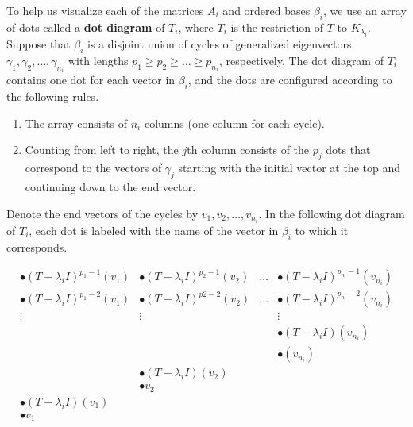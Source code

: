 \begin{definition}
	To help us visualize each of the matrices $A_i$ and ordered bases $\beta_i$, we use an array of dots called a \textbf{dot diagram} of $T_i$, where $T_i$ is the restriction of $T$ to $K_{\lambda_i}$. Suppose that $\beta_i$ is a disjoint union of cycles of generalized eigenvectors $\gamma_1, \gamma_2, \dots, \gamma_{n_i}$ with lengths $p_1 \geq p_2 \geq \dots \geq p_{n_i}$, respectively. The dot diagram of $T_i$ contains one dot for each vector in $\beta_i$, and the dots are configured according to the following rules.

	\begin{enumerate}
		\item The array consists of $n_i$ columns (one column for each cycle).
		\item Counting from left to right, the $j$th column consists of the $p_j$ dots that correspond to the vectors of $\gamma_j$ starting with the initial vector at the top and continuing down to the end vector.
	\end{enumerate}

	Denote the end vectors of the cycles by $v_1, v_2, \dots, v_{n_i}$. In the following dot diagram of $T_i$, each dot is labeled with the name of the vector in $\beta_i$ to which it corresponds.

	\[\begin{array}{llll}
			\bullet(T - \lambda_i I)^{p_1 - 1}(v_1) & \bullet(T - \lambda_i I)^{p_2-1}(v_2)  & \dots & \bullet (T-\lambda_i I)^{p_{n_i} - 1}(v_{n_i})  \\
			\bullet(T - \lambda_i I)^{p_1 - 2}(v_1) & \bullet(T - \lambda_i I)^{p2 - 2}(v_2) & \dots & \bullet(T - \lambda_i I)^{p_{n_i} - 2}(v_{n_i}) \\
			\vdots                                  & \vdots                                 &       & \vdots                                          \\
			                                        &                                        &       & \bullet(T - \lambda_i I)(v_{n_i})               \\
			                                        &                                        &       & \bullet(v_{n_i})                                \\
			                                        & \bullet(T - \lambda_i I)(v_2)          &       &                                                 \\
			                                        & \bullet v_2                            &       &                                                 \\
			\bullet(T - \lambda_i I)(v_1)           &                                        &                                                         \\
			\bullet v_1
		\end{array}\]


\end{definition}
